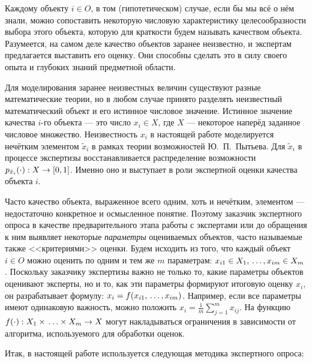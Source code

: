Каждому объекту $i \in O$, в том (гипотетическом) случае, если бы мы всё о нём знали, можно сопоставить некоторую числовую характеристику целесообразности выбора этого объекта, которую для краткости будем называть качеством объекта. Разумеется, на самом деле качество объектов заранее неизвестно, и экспертам предлагается выставить его оценку. Они способны сделать это в силу своего опыта и глубоких знаний предметной области.

Для моделирования заранее неизвестных величин существуют разные математические теории, но в любом случае принято разделять неизвестный математический объект и его истинное числовое значение. Истинное значение качества $i$-го объекта --- это число $x_i \in X$, где $X$ --- некоторое наперёд заданное числовое множество. Неизвестность $x_i$ в настоящей работе моделируется нечётким элементом $\tilde x_i$ в рамках теории возможностей Ю.~П.~Пытьева. Для $\tilde x_i$ в процессе экспертизы восстанавливается распределение возможности $p_{\tilde x_i}(\cdot): X \rightarrow [0,1]$. Именно оно и выступает в роли экспертной оценки качества объекта $i$.  

Часто качество объекта, выраженное всего одним, хоть и нечётким, элементом --- недостаточно конкретное и осмысленное понятие. Поэтому заказчик экспертного опроса в качестве предварительного этапа работы с экспертами или до обращения к ним выявляет некоторые {\sl параметры} оцениваемых объектов, часто называемые также <<критериями>> оценки. Будем исходить из того, что каждый объект $i \in O$ можно оценить по одним и тем же $m$ параметрам: $x_{i1} \in X_1, \, \ldots, x_{im} \in X_m$.  Поскольку заказчику экспертизы важно не только то, какие параметры объектов оценивают эксперты, но и то, как эти параметры формируют итоговую оценку $x_i$, он разрабатывает формулу: $x_i = f(x_{i1}, \, \ldots, x_{im})$. Например, если все параметры имеют одинаковую важность, можно положить $x_i = \frac{1}{m}\sum_{j=1}^m{x_{ij}}$. На функцию $f(\cdot): X_1 \times \, \ldots \times X_m \rightarrow X$ могут накладываться ограничения в зависимости от алгоритма, используемого для обработки оценок. 


Итак, в настоящей работе используется следующая методика экспертного опроса:
\begin{center}  \end{center}

